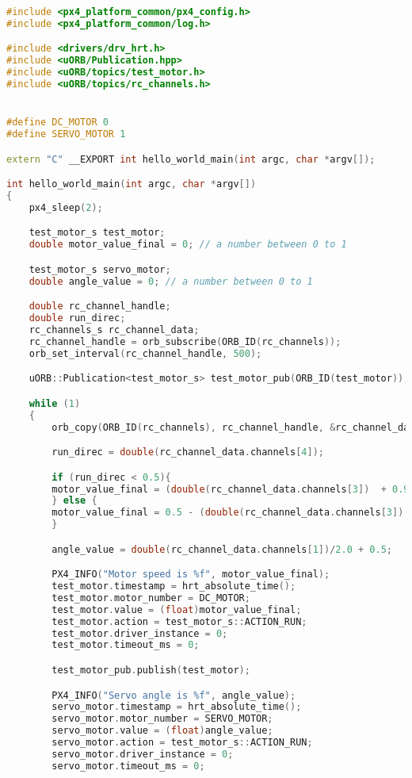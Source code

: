 \begin{lstlisting}[language=c++,caption=Part 1 Code, label=list:part1]
#include <px4_platform_common/px4_config.h>
#include <px4_platform_common/log.h>

#include <drivers/drv_hrt.h>
#include <uORB/Publication.hpp>
#include <uORB/topics/test_motor.h>
#include <uORB/topics/rc_channels.h>


#define DC_MOTOR 0
#define SERVO_MOTOR 1

extern "C" __EXPORT int hello_world_main(int argc, char *argv[]);

int hello_world_main(int argc, char *argv[])
{
    px4_sleep(2);

    test_motor_s test_motor;
    double motor_value_final = 0; // a number between 0 to 1

    test_motor_s servo_motor;
    double angle_value = 0; // a number between 0 to 1

    double rc_channel_handle;
    double run_direc;
    rc_channels_s rc_channel_data;
    rc_channel_handle = orb_subscribe(ORB_ID(rc_channels));
    orb_set_interval(rc_channel_handle, 500);

    uORB::Publication<test_motor_s> test_motor_pub(ORB_ID(test_motor));

    while (1)
    {
        orb_copy(ORB_ID(rc_channels), rc_channel_handle, &rc_channel_data);

        run_direc = double(rc_channel_data.channels[4]);

        if (run_direc < 0.5){
        motor_value_final = (double(rc_channel_data.channels[3])  + 0.96)/1.96/2.0;
        } else {
        motor_value_final = 0.5 - (double(rc_channel_data.channels[3]) + 0.96)/1.96/2.0;
        }

        angle_value = double(rc_channel_data.channels[1])/2.0 + 0.5;

        PX4_INFO("Motor speed is %f", motor_value_final);
        test_motor.timestamp = hrt_absolute_time();
        test_motor.motor_number = DC_MOTOR;
        test_motor.value = (float)motor_value_final;
        test_motor.action = test_motor_s::ACTION_RUN;
        test_motor.driver_instance = 0;
        test_motor.timeout_ms = 0;

        test_motor_pub.publish(test_motor);

        PX4_INFO("Servo angle is %f", angle_value);
        servo_motor.timestamp = hrt_absolute_time();
        servo_motor.motor_number = SERVO_MOTOR;
        servo_motor.value = (float)angle_value;
        servo_motor.action = test_motor_s::ACTION_RUN;
        servo_motor.driver_instance = 0;
        servo_motor.timeout_ms = 0;


\end{lstlisting}
